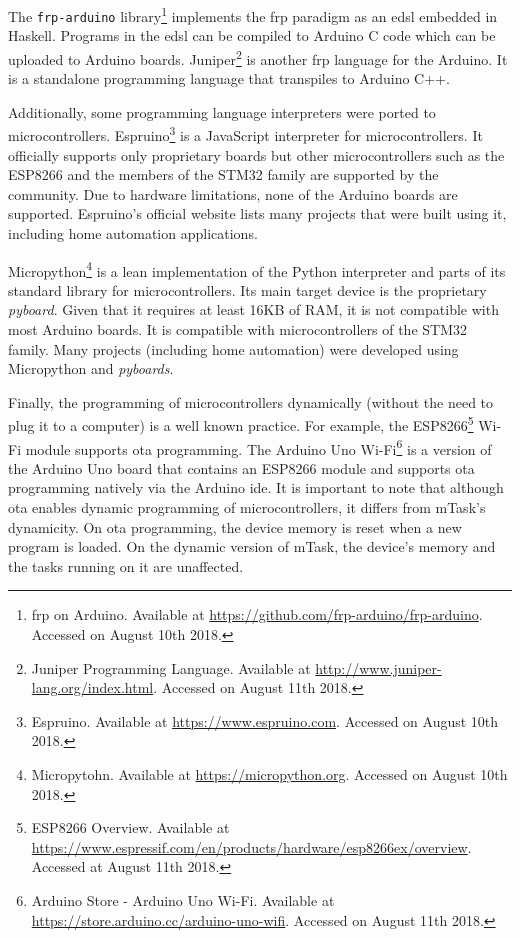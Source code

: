 The \texttt{frp-arduino} library\footnote{\acs{frp} on Arduino. Available at \url{https://github.com/frp-arduino/frp-arduino}. Accessed on August 10th 2018.} implements the \ac{frp} paradigm as an \ac{edsl} embedded in Haskell. Programs in the \ac{edsl} can be compiled to Arduino C code which can be uploaded to Arduino boards. Juniper\footnote{Juniper Programming Language. Available at \url{http://www.juniper-lang.org/index.html}. Accessed on August 11th 2018.} is another \ac{frp} language for the Arduino. It is a standalone programming language that transpiles to Arduino C++.

Additionally, some programming language interpreters were ported to microcontrollers. Espruino\footnote{Espruino. Available at \url{https://www.espruino.com}. Accessed on August 10th 2018.} is a JavaScript interpreter for microcontrollers. It officially supports only proprietary boards but other microcontrollers such as the ESP8266 and the members of the STM32 family are supported by the community. Due to hardware limitations, none of the Arduino boards are supported. Espruino's official website lists many projects that were built using it, including home automation applications. 

Micropython\footnote{Micropytohn. Available at \url{https://micropython.org}. Accessed on August 10th 2018.} is a lean implementation of the Python interpreter and parts of its standard library for microcontrollers. Its main target device is the proprietary \textit{pyboard}. Given that it requires at least 16KB of RAM, it is not compatible with most Arduino boards. It is compatible with microcontrollers of the STM32 family. Many projects (including home automation) were developed using Micropython and \textit{pyboards}. 

Finally, the programming of microcontrollers dynamically (without the need to plug it to a computer) is a well known practice. For example, the ESP8266\footnote{ESP8266 Overview. Available at \url{https://www.espressif.com/en/products/hardware/esp8266ex/overview}. Accessed at August 11th 2018.} Wi-Fi module supports \ac{ota} programming. The Arduino Uno Wi-Fi\footnote{Arduino Store - Arduino Uno Wi-Fi. Available at \url{https://store.arduino.cc/arduino-uno-wifi}. Accessed on August 11th 2018.} is a version of the Arduino Uno board that contains an ESP8266 module and supports \ac{ota} programming natively via the Arduino \acs{ide}. It is important to note that although \ac{ota} enables dynamic programming of microcontrollers, it differs from mTask's dynamicity. On \ac{ota} programming, the device memory is reset when a new program is loaded. On the dynamic version of mTask, the device's memory and the tasks running on it are unaffected.